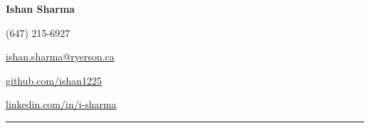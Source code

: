 \noindent
\begin{minipage}[b]{0.6\textwidth}
\Huge\textbf{Ishan Sharma}
\end{minipage}
\begin{minipage}[b]{0.4\textwidth}
\begin{flushright}%
(647) 215-6927\par
\href{mailto:ishan.sharma@ryerson.ca}{ishan.sharma@ryerson.ca}\par
\href{https://github.com/ishan1225}{github.com/ishan1225}\par
\href{https://www.linkedin.com/in/i-sharma}{linkedin.com/in/i-sharma}
\end{flushright}
\end{minipage}
\smallskip
\hrule
